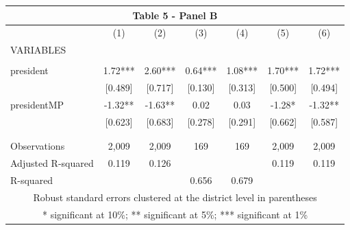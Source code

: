 \begin{tabular}{lcccccc}
\multicolumn{7}{c}{Table 5 - Panel B} \\ \hline
 & (1) & (2) & (3) & (4) & (5) & (6) \\
VARIABLES &  &  &  &  &  &  \\ \hline
 &  &  &  &  &  &  \\
president & 1.72*** & 2.60*** & 0.64*** & 1.08*** & 1.70*** & 1.72*** \\
 & [0.489] & [0.717] & [0.130] & [0.313] & [0.500] & [0.494] \\
presidentMP & -1.32** & -1.63** & 0.02 & 0.03 & -1.28* & -1.32** \\
 & [0.623] & [0.683] & [0.278] & [0.291] & [0.662] & [0.587] \\
 &  &  &  &  &  &  \\
 &  &  &  &  &  &  \\
Observations & 2,009 & 2,009 & 169 & 169 & 2,009 & 2,009 \\
Adjusted R-squared & 0.119 & 0.126 &  &  & 0.119 & 0.119 \\
 R-squared &  &  & 0.656 & 0.679 &  &  \\ \hline
\multicolumn{7}{c}{ Robust standard errors clustered at the district level in parentheses} \\
\multicolumn{7}{c}{ * significant at 10\%; ** significant at 5\%; *** significant at 1\%} \\
\end{tabular}
